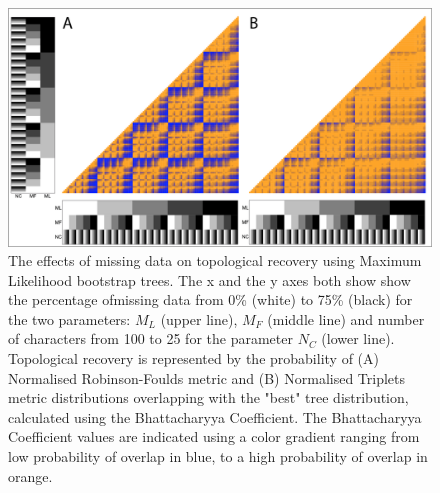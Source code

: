 \documentclass[12pt,letterpaper]{article}
\begin{document}
\begin{figure} 
\centering
    \includegraphics[width=1\textwidth]{SupplementaryFigures/PairwiseComp-Boot-RF+Tr-colour.png} %
    \caption{The effects of missing data on topological recovery using Maximum Likelihood bootstrap trees. The x and the y axes both show show the percentage ofmissing data from 0\% (white) to 75\% (black) for the two parameters: $M_{L}$ (upper line), $M_{F}$ (middle line) and number of characters from 100 to 25 for the parameter $N_{C}$ (lower line). Topological recovery is represented by the probability of (A) Normalised Robinson-Foulds metric and (B) Normalised Triplets metric distributions overlapping with the "best" tree distribution, calculated using the Bhattacharyya Coefficient. The Bhattacharyya Coefficient values are indicated using a color gradient ranging from low probability of overlap in blue, to a high probability of overlap in orange.}
\label{Fig_Supp_paircomp_Boot}
\end{figure} 
\end{document}
